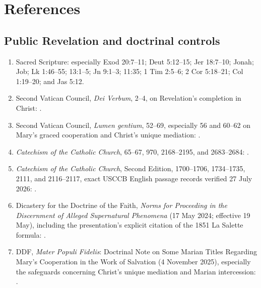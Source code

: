\section{References}

\begingroup
\footnotesize
\linespread{0.98}\selectfont
\setlength{\parskip}{0pt}

\subsection{Public Revelation and doctrinal controls}

\begin{enumerate}
  \item Sacred Scripture: especially Exod 20:7--11; Deut 5:12--15; Jer 18:7--10; Jonah; Job; Lk 1:46--55; 13:1--5; Jn 9:1--3; 11:35; 1 Tim 2:5--6; 2 Cor 5:18--21; Col 1:19--20; and Jas 5:12.
  \item Second Vatican Council, \emph{Dei Verbum}, 2--4, on Revelation's completion in Christ: .
  \item Second Vatican Council, \emph{Lumen gentium}, 52--69, especially 56 and 60--62 on Mary's graced cooperation and Christ's unique mediation: .
  \item \emph{Catechism of the Catholic Church}, 65--67, 970, 2168--2195, and 2683--2684: .
  \item \emph{Catechism of the Catholic Church}, Second Edition, 1700--1706, 1734--1735, 2111, and 2116--2117, exact USCCB English passage records verified 27 July 2026: .
  \item Dicastery for the Doctrine of the Faith, \emph{Norms for Proceeding in the Discernment of Alleged Supernatural Phenomena} (17 May 2024; effective 19 May), including the presentation's explicit citation of the 1851 La Salette formula: .
  \item DDF, \emph{Mater Populi Fidelis}: Doctrinal Note on Some Marian Titles Regarding Mary's Cooperation in the Work of Salvation (4 November 2025), especially the safeguards concerning Christ's unique mediation and Marian intercession: .

\end{enumerate}
